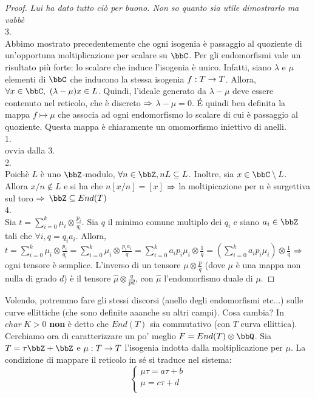 \begin{proof} {\it Lui ha dato tutto ciò per buono. Non so quanto sia utile dimostrarlo ma vabbè}\\
3.\\
Abbimo mostrato precedentemente che ogni isogenia è passaggio al quoziente di un'opportuna moltiplicazione per scalare su $\bbC$. Per gli endomorfismi vale un risultato più forte: lo scalare che induce l'isogenia è unico.
Infatti, siano $\lambda$ e $\mu$ elementi di $\bbC$ che inducono la stessa isogenia $f:T\rightarrow T$. Allora, $\forall x\in \bbC,  \ (\lambda - \mu)x \in L$. Quindi, l'ideale generato da $\lambda -\mu$ deve essere contenuto nel reticolo, che è discreto $\Rightarrow$ $\lambda - \mu = 0$. \'E quindi ben definita la mappa $f \mapsto \mu$ che associa ad ogni endomorfismo lo scalare di cui è passaggio al quoziente. Questa mappa è chiaramente un omomorfismo iniettivo di anelli.\\
1.\\
ovvia dalla 3.\\
2.\\
Poichè $L$ è uno $\bbZ$-modulo, $\forall n \in \bbZ, nL\subseteq L$. Inoltre, sia $x\in \bbC \setminus L$. Allora $x/n \not\in L$ e si ha che $n[x/n]=[x]$ $\Rightarrow$ la moltipicazione per n è surgettiva sul toro $\Rightarrow$ $\bbZ \subseteq End(T)$\\
4.\\
Sia $t=\sum\limits_{i=0}^{k} \mu_{i} \otimes \frac{p_{i}}{q_{i}}$. Sia $q$ il minimo comune multiplo dei $q_{i}$ e siano $a_{i} \in \bbZ$ tali che $\forall i, q=q_{i}a_{i}$. Allora,\\
$t=\sum\limits_{i=0}^{k} \mu_{i}\otimes \frac{p_{i}}{q_{i}} = \sum\limits_{i=0}^{k} \mu_{i} \otimes \frac{p_{i}a_{i}}{q}= \sum\limits_{i=0}^{k} a_{i}p_{i}\mu_{i}\otimes \frac{1}{q} = (\sum\limits_{i=0}^{k} a_{i}p_{i}\mu_{i})\otimes \frac{1}{q}$ $\Rightarrow$ ogni tensore è semplice. L'inverso di un tensore $\mu \otimes \frac{p}{q}$ (dove $\mu$ è una mappa non nulla di grado $d$) è il tensore $\hat{\mu} \otimes \frac{q}{pd}$, con $\hat{\mu}$ l'endomorfismo duale di $\mu$.
\end{proof}

Volendo, potremmo fare gli stessi discorsi (anello degli endomorfismi etc...) sulle curve ellittiche (che sono definite aaanche su altri campi). Cosa cambia? In $char \ K >0$ {\bf non } è detto che $End(T)$ sia commutativo (con $T$ curva ellittica).\\

Cerchiamo ora di caratterizzare un po' meglio $F=End(T) \otimes \bbQ$. Sia $T=\tau \bbZ + \bbZ$ e $\mu : T \rightarrow T$ l'isogenia indotta dalla moltiplicazione per $\mu$. La condizione di mappare il reticolo in sé si traduce nel sistema:
\begin{equation*}
\begin{cases}
	\mu \tau = a\tau + b\\
	\mu = c\tau + d\\
\end{cases}
\end{equation*}

